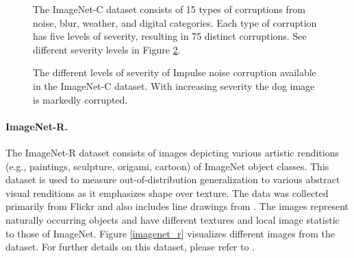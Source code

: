 \documentclass{article}
\begin{document}
\begin{figure}[ht]
\begin{tikzpicture}[picture format/.style={inner sep=2pt,}]
\end{tikzpicture}
\caption{The ImageNet-C dataset consists of 15 types of corruptions from noise, blur, weather, and digital categories. Each type of corruption has five levels of severity,
resulting in 75 distinct corruptions. See different severity levels in Figure \ref{severities}.}
\label{corruption_types}
\end{figure}


\begin{figure}
\centering
{}
\caption{The  different levels of severity of Impulse noise corruption available in the ImageNet-C dataset. With increasing severity the dog image is markedly corrupted.}
\label{severities}
\end{figure}


\paragraph{ImageNet-R.} 
The ImageNet-R dataset \citep{hendrycks2020many} consists of  images depicting various
artistic renditions (e.g., paintings, sculpture, origami, cartoon) of  ImageNet object classes. 
This dataset is used to measure out-of-distribution generalization to various abstract visual renditions as it emphasizes shape over texture.
The data was collected primarily from Flickr and also includes line drawings from \citep{Wang2019LearningRG}.
The images represent naturally occurring objects and have different textures and local image statistic to those of ImageNet. Figure \ref{imagenet_r} visualizes different images from the dataset.
For further details on this dataset, please refer to \citep{hendrycks2020many}.
\end{document}
